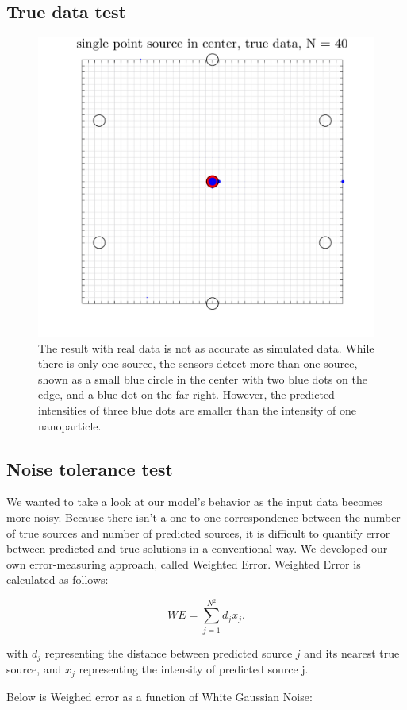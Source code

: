 \documentclass[a4paper]{article}
\begin{document}
\subsection{True data test}

\begin{figure}[H]
\centering
\includegraphics[width=.7\textwidth]{true_source_copy.pdf}
\caption{The result with real data is not as accurate as simulated data. While there is only one source, the sensors detect more than one source, shown as a small blue circle in the center with two blue dots on the edge, and a blue dot on the far right. However, the predicted intensities of three blue dots are smaller than the intensity of one nanoparticle.}
\label{Figure 7}
\end{figure}

\subsection{Noise tolerance test}

We wanted to take a look at our model's behavior as the input data becomes more noisy. Because there isn't a one-to-one correspondence between the number of true sources and number of predicted sources, it is difficult to quantify error between predicted and true solutions in a conventional way. We developed our own error-measuring approach, called Weighted Error. Weighted Error is calculated as follows:

\[ 
WE = \sum \limits_{j=1}^{N^2} d_j x_j.
\]

with $d_j$ representing the distance between predicted source $j$ and its nearest true source, and $x_j$ representing the intensity of predicted source j.

Below is Weighed error as a function of White Gaussian Noise:
\end{document}
